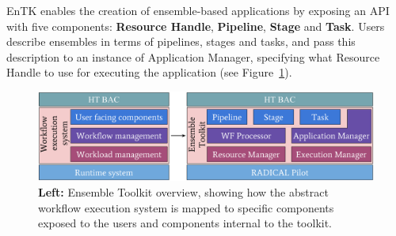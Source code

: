 

EnTK enables the creation of ensemble-based applications by 
exposing an API with five components: %
\textbf{Resource Handle}, \textbf{Pipeline}, \textbf{Stage} and
\textbf{Task}. %
Users describe ensembles in terms of pipelines, stages and tasks, and pass this description to an instance of 
Application Manager, %
specifying what Resource Handle to use for executing the application (see
Figure~\ref{fig:entk_arch}).


\begin{figure}
  \centering
  \includegraphics[width=\columnwidth]{FIGURES/entk_overview.pdf}
  \caption{\textbf{Left:} Ensemble Toolkit overview, showing how the abstract
           workflow execution system is mapped to specific components exposed
           to the users and components internal to the
           toolkit.}\label{fig:entk_arch}
\end{figure}

